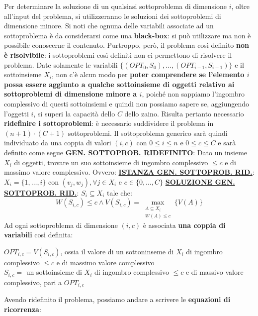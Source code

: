 \documentclass[12pt]{article}
\begin{document}
Per determinare la soluzione di un qualsiasi sottoproblema di dimensione $i$, oltre all'input del problema, si utilizzeranno le soluzioni dei sottoproblemi di dimensione minore.
Si noti che ognuna delle variabili associate ad un sottoproblema è da considerarsi come una \textbf{black-box}: si può utilizzare ma non è possibile conoscerne il contenuto. \newline
Purtroppo, però, il problema così definito \textbf{non è risolvibile}: i sottoproblemi così definiti non ci permettono di risolvere il problema. Date solamente le variabili $\{(OPT_0, S_0), \dots, (OPT_{i-1}, S_{i-1})\}$ e il sottoinsieme $X_i$, non c'è alcun modo
per \textbf{poter comprendere se l'elemento $i$ possa essere aggiunto a qualche sottoinsieme di oggetti relativo ai sottoproblemi di dimensione minore a $i$}, poiché non sappiamo l'ingombro complessivo di questi sottoinsiemi e quindi non possiamo sapere se, aggiungendo l'oggetti $i$, si superi la capacità dello $C$ dello zaino.
Risulta pertanto necessario \textbf{ridefinire i sottoproblemi}: è necessario suddividere il problema in $(n+1) \cdot (C+1)$ sottoproblemi. Il sottoproblema generico sarà quindi individuato da una coppia di valori $(i,c)$ con $0 \leq i \leq n$ e $0 \leq c \leq C$ e sarà definito come segue \newline
\textbf{\underline{GEN. SOTTOPROB. RIDEFINITO}}: Dato un insieme $X_i$ di oggetti, trovare un suo sottoinsieme di ingombro complessivo $\leq c$ e di massimo valore complessivo. \newline
Ovvero: \newline
\textbf{\underline{ISTANZA GEN. SOTTOPROB. RID.}}: $X_i = \{1,\dots, i\}$ con $(v_j, w_j), \forall j \in X_i$ e $c \in \{0, \dots, C\}$ \newline
\textbf{\underline{SOLUZIONE GEN. SOTTOPROB. RID.}}: $S_i \subseteq X_i$ tale che:
$$W(S_{i,c}) \leq c \land V(S_{i,c}) = \max_{\substack{A \subseteq X_i \\ W(A) \leq c}} \{V(A)\}$$
Ad ogni sottoproblema di dimensione $(i,c)$ è associata \textbf{una coppia di variabili} così definita:
\begin{center}
    $OPT_{i,c} = V(S_{i,c})$, ossia il valore di un sottoninseme di $X_i$ di ingombro complessivo $\leq c$ e di massimo valore complessivo \\
    $S_{i,c} =$ un sottoinsieme di $X_i$ di ingombro complessivo $\leq c$ e di massivo valore complessivo, pari a $OPT_{i,c}$
\end{center}
Avendo ridefinito il problema, possiamo andare a scrivere le \textbf{equazioni di ricorrenza}: \newline
\end{document}
